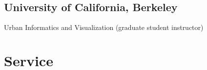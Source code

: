 \documentclass[11pt,letterpaper]{report}
\newcommand{\listitemspace}{0.25em}
\renewenvironment{itemize}
{\begin{list}{}{\setlength{\leftmargin}{0em}
                \setlength{\parskip}{0em}
                \setlength{\itemsep}{\listitemspace}
                \setlength{\parsep}{\listitemspace}}}
{\end{list}}
\begin{document}
    \subsection*{University of California, Berkeley}

    \begin{itemize}

        \item Urban Informatics and Visualization (graduate student instructor)

    \end{itemize}


    \section*{Service}

%
%
%

%
%
%






%
%
\end{document}
